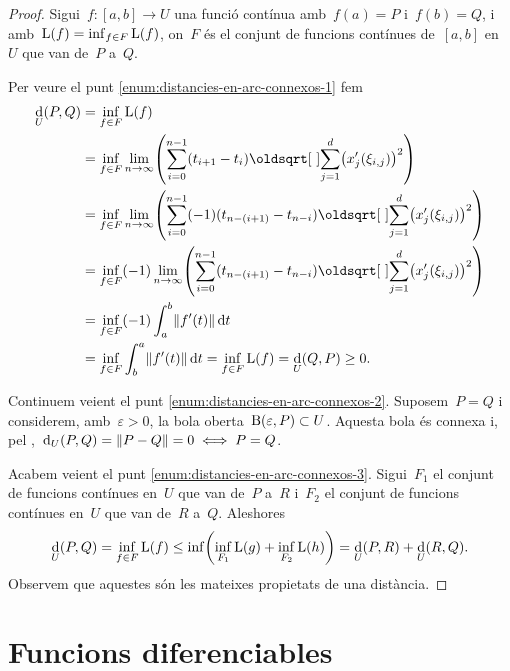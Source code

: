 \documentclass[../../main.tex]{subfiles}
\begin{document}
    \begin{proof}
        Sigui~\(f\colon[a,b]\to U\) una funció contínua amb~\(f(a)=P\) i~\(f(b)=Q\), i  amb~\(\operatorname*{L}(f)=\inf_{f\in F}\operatorname*{L}(f)\), on~\(F\) és el conjunt de funcions contínues de~\([a,b]\) en~\(U\) que van de~\(P\) a~\(Q\).

        Per veure el punt \eqref{enum:distancies-en-arc-connexos-1} fem
        \begin{align*}
        \Dist_{U}(P,Q)&=\inf_{f\in F}\Long(f)\\
        &=\inf_{f\in F}\lim_{n\to\infty}\left(\sum_{i=0}^{n-1}(t_{i+1}-t_{i})\sqrt{\sum_{j=1}^{d}\left(x_{j}'(\xi_{i,j})\right)^2}\right)\\
        &=\inf_{f\in F}\lim_{n\to\infty}\left(\sum_{i=0}^{n-1}(-1)(t_{n-(i+1)}-t_{n-i})\sqrt{\sum_{j=1}^{d}\left(x_{j}'(\xi_{i,j})\right)^2}\right)\\
        &=\inf_{f\in F}(-1)\lim_{n\to\infty}\left(\sum_{i=0}^{n-1}(t_{n-(i+1)}-t_{n-i})\sqrt{\sum_{j=1}^{d}\left(x_{j}'(\xi_{i,j})\right)^2}\right)\\
        &=\inf_{f\in F}(-1)\int_{a}^{b}\norm{f'(t)}\diff t\\
        &=\inf_{f\in F}\int_{b}^{a}\norm{f'(t)}\diff t=\inf_{f\in F}\Long(f)=\Dist_{U}(Q,P)\geq0.
        \end{align*}

        Continuem veient el punt \eqref{enum:distancies-en-arc-connexos-2}.
        Suposem~\(P=Q\) i considerem, amb~\(\varepsilon>0\), la bola oberta~\(\operatorname{B}(\varepsilon,P)\subset U\).
        Aquesta bola és connexa i, pel \corollari{} ,~\(\Dist_{U}(P,Q)=\norm{P-Q}=0\sii P=Q\).%

        Acabem veient el punt \eqref{enum:distancies-en-arc-connexos-3}.
        Sigui~\(F_{1}\) el conjunt de funcions contínues en~\(U\) que van de~\(P\) a~\(R\) i~\(F_{2}\) el conjunt de funcions contínues en~\(U\) que van de~\(R\) a~\(Q\).
        Aleshores
        \begin{displaymath}
        \Dist_{U}(P,Q)=\inf_{f\in F}\Long(f)\leq\inf\left(\inf_{F_{1}}\Long(g)+\inf_{F_{2}}\Long(h)\right)=\Dist_{U}(P,R)+\Dist_{U}(R,Q).
        \end{displaymath}%
        Observem que aquestes són les mateixes propietats de una distància.
    \end{proof}
\section{Funcions diferenciables}
\end{document}
